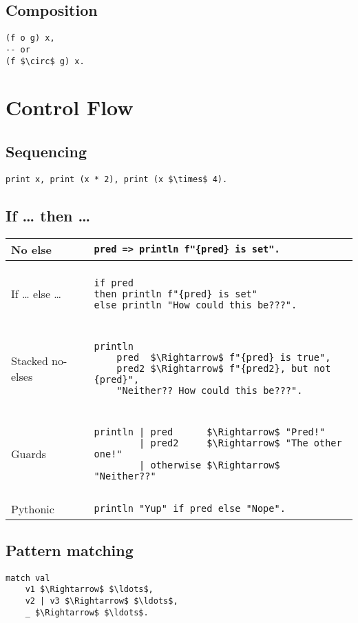 \documentclass[a4paper,12pt]{article}
\makeatletter
\newcommand{\code}{\lstinline}
\newcommand{\br}{\\ [0.5em] \hline \\ [-0.5em]}
\newenvironment{data}
    {
        \begin{center}
        \begin{tabular*}{\textwidth}{ l@{\extracolsep{\fill}}l }
    }
    {
        \end{tabular*}
        \end{center}
    }
\makeatother
\begin{document}
\subsection{Composition}
\begin{lstlisting}[mathescape=true]
(f o g) x,
-- or
(f $\circ$ g) x.
\end{lstlisting}


\section{Control Flow}
\subsection{Sequencing}
    \code[mathescape=true]|print x, print (x * 2), print (x $\times$ 4).|

\subsection{If \ldots{} then \ldots{}}
\begin{data}
No else &
    \code|pred => println f"{pred} is set".| \br
If \ldots{} else \ldots{} &
    \begin{lstlisting}
if pred
then println f"{pred} is set"
else println "How could this be???".
    \end{lstlisting} \br

Stacked no-elses &
    \begin{lstlisting}[mathescape=true]
println     
    pred  $\Rightarrow$ f"{pred} is true",
    pred2 $\Rightarrow$ f"{pred2}, but not {pred}",
    "Neither?? How could this be???".
    \end{lstlisting} \br
Guards &
    \begin{lstlisting}[mathescape=true]
println | pred      $\Rightarrow$ "Pred!" 
        | pred2     $\Rightarrow$ "The other one!" 
        | otherwise $\Rightarrow$ "Neither??"
    \end{lstlisting} \br
Pythonic &
    \code|println "Yup" if pred else "Nope".|
\end{data}

\subsection{Pattern matching}
\begin{lstlisting}[mathescape=true]
match val
    v1 $\Rightarrow$ $\ldots$,
    v2 | v3 $\Rightarrow$ $\ldots$,
    _ $\Rightarrow$ $\ldots$.
\end{lstlisting}
\end{document}
